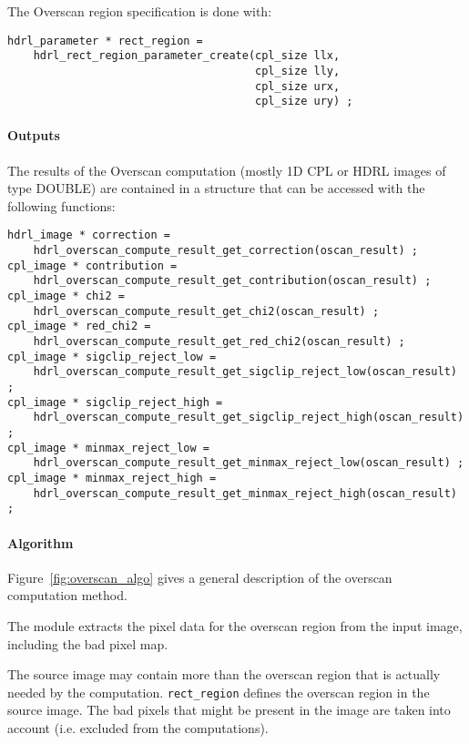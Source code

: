 The Overscan region specification is done with:
\begin{lstlisting}
hdrl_parameter * rect_region =
    hdrl_rect_region_parameter_create(cpl_size llx, 
                                      cpl_size lly,
                                      cpl_size urx, 
                                      cpl_size ury) ;
\end{lstlisting}

\paragraph{Outputs}

The results of the Overscan computation (mostly 1D CPL or HDRL images of
type DOUBLE) are contained in a structure that can be accessed with the 
following functions:

\begin{lstlisting}
hdrl_image * correction =  
    hdrl_overscan_compute_result_get_correction(oscan_result) ;
cpl_image * contribution =
    hdrl_overscan_compute_result_get_contribution(oscan_result) ;
cpl_image * chi2 = 
    hdrl_overscan_compute_result_get_chi2(oscan_result) ;
cpl_image * red_chi2 = 
    hdrl_overscan_compute_result_get_red_chi2(oscan_result) ;
cpl_image * sigclip_reject_low = 
    hdrl_overscan_compute_result_get_sigclip_reject_low(oscan_result) ;
cpl_image * sigclip_reject_high = 
    hdrl_overscan_compute_result_get_sigclip_reject_high(oscan_result) ;
cpl_image * minmax_reject_low = 
    hdrl_overscan_compute_result_get_minmax_reject_low(oscan_result) ;
cpl_image * minmax_reject_high = 
    hdrl_overscan_compute_result_get_minmax_reject_high(oscan_result) ;
\end{lstlisting}

\paragraph{Algorithm}

Figure~\ref{fig:overscan_algo} gives a general description of the overscan 
computation method.

The module extracts the pixel data for the overscan region from the
input image, including the bad pixel map. 

The source image may contain more than the overscan region that is actually 
needed by the computation.
\verb+rect_region+ defines the overscan region in the source image. The bad pixels 
that might be present in the image are taken into account (i.e. excluded 
from the computations). 

